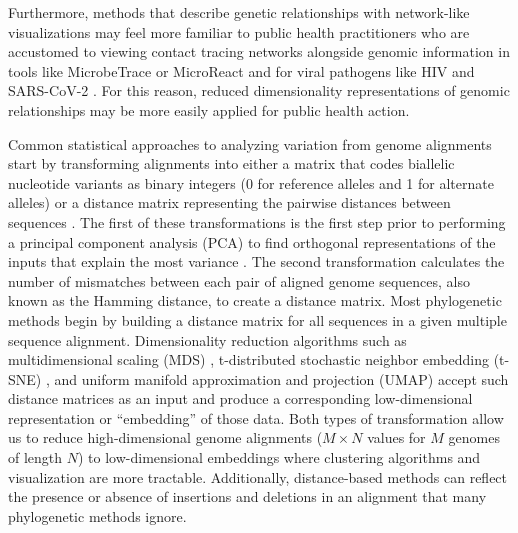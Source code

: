 \documentclass[webpdf,contemporary,large,single]{oup-authoring-template}%
\theoremstyle{thmstyleone}%
\theoremstyle{thmstyletwo}%
\theoremstyle{thmstylethree}%
\begin{document}
Furthermore, methods that describe genetic relationships with network-like visualizations may feel more familiar to public health practitioners who are accustomed to viewing contact tracing networks alongside genomic information in tools like MicrobeTrace \citep{Campbell2021} or MicroReact \citep{Argimon2016} and for viral pathogens like HIV \citep{Wertheim2017,Campbell2020} and SARS-CoV-2 \citep{Kirbiyik2020,Vang2021}.
For this reason, reduced dimensionality representations of genomic relationships may be more easily applied for public health action.

Common statistical approaches to analyzing variation from genome alignments start by transforming alignments into either a matrix that codes biallelic nucleotide variants as binary integers (0 for reference alleles and 1 for alternate alleles) \citep{mcvean_2009} or a distance matrix representing the pairwise distances between sequences \citep{rambaut_2008}.
The first of these transformations is the first step prior to performing a principal component analysis (PCA) to find orthogonal representations of the inputs that explain the most variance \citep{jolliffe_cadima_2016}.
The second transformation calculates the number of mismatches between each pair of aligned genome sequences, also known as the Hamming distance, to create a distance matrix.
Most phylogenetic methods begin by building a distance matrix for all sequences in a given multiple sequence alignment.
Dimensionality reduction algorithms such as multidimensional scaling (MDS) \citep{hout_papesh_goldinger_2012}, t-distributed stochastic neighbor embedding (t-SNE) \citep{maaten2008visualizing}, and uniform manifold approximation and projection (UMAP) \citep{lel2018umap} accept such distance matrices as an input and produce a corresponding low-dimensional representation or ``embedding'' of those data.
Both types of transformation allow us to reduce high-dimensional genome alignments ($M \times N$ values for $M$ genomes of length $N$) to low-dimensional embeddings where clustering algorithms and visualization are more tractable.
Additionally, distance-based methods can reflect the presence or absence of insertions and deletions in an alignment that many phylogenetic methods ignore.
\end{document}
